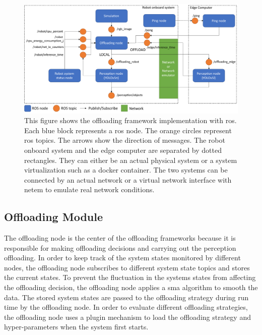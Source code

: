 \begin{figure}
    \centering
    \includegraphics[width=\linewidth]{figures/setup/ros_implementation.pdf}
    \caption[Offloading framework implementation with \acrshort{ros}]{This figure shows the offloading framework implementation with \gls{ros}. Each blue block represents a \gls{ros} node. The orange circles represent \gls{ros} topics. The arrows show the direction of messages. The robot onboard system and the edge computer are separated by dotted rectangles. They can either be an actual physical system or a system virtualization such as a \gls{docker} container. The two systems can be connected by an actual network or a virtual network interface with \gls{netem} to emulate real network conditions.}
    \label{fig:ros_implementation}
\end{figure}

\subsection{Offloading Module}


The offloading node is the center of the offloading frameworks because it is responsible for making offloading decisions and carrying out the perception offloading. In order to keep track of the system states monitored by different nodes, the offloading node subscribes to different system state topics and stores the current states. To prevent the fluctuation in the systems states from affecting the offloading decision, the offloading node applies a \gls{sma} algorithm to smooth the data. The stored system states are passed to the offloading strategy during run time by the offloading node. In order to evaluate different offloading strategies, the offloading node uses a plugin mechanism to load the offloading strategy and hyper-parameters when the system first starts. 

